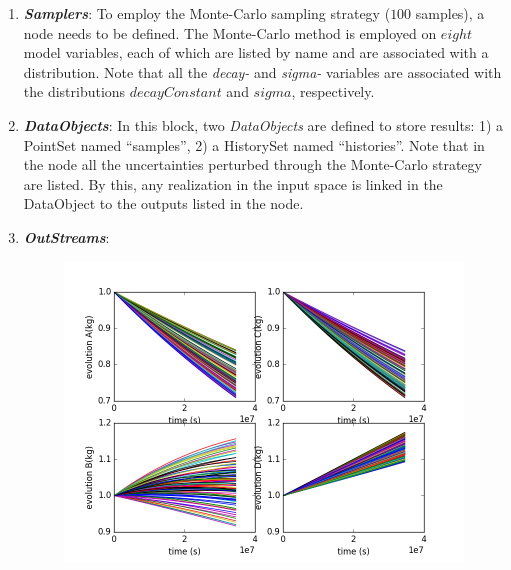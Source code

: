 \begin{enumerate}
\begin{itemize}
     \end{itemize}
   \item \textbf{\textit{Samplers}}:
      To employ the Monte-Carlo sampling strategy ($100$ samples), a
       node needs to be defined.  The
      Monte-Carlo method is employed on $eight$ model variables, each of which are listed by name
      and are associated with a distribution.
      Note that all the \textit{decay-\*} and
      \textit{sigma-\*} variables are associated with the distributions
      $decayConstant$ and $sigma$, respectively.
   \item \textbf{\textit{DataObjects}}:
      In this block, two \textit{DataObjects} are defined to store results: 1) a PointSet named
      ``samples'', 2) a HistorySet named ``histories''.
      Note that in the  node all the uncertainties
      perturbed through the Monte-Carlo strategy are listed. By this, any
      realization in the input space is linked in the DataObject to the outputs listed in the
       node.
   \item \textbf{\textit{OutStreams}}:
 \begin{figure}[h!]
  \centering
  \includegraphics[scale=0.7]{../../tests/framework/user_guide/ForwardSamplingStrategies/gold/RunDir/MonteCarlo/1-historyPlot_line-line-line-line.png}

\end{figure}
\end{enumerate}
